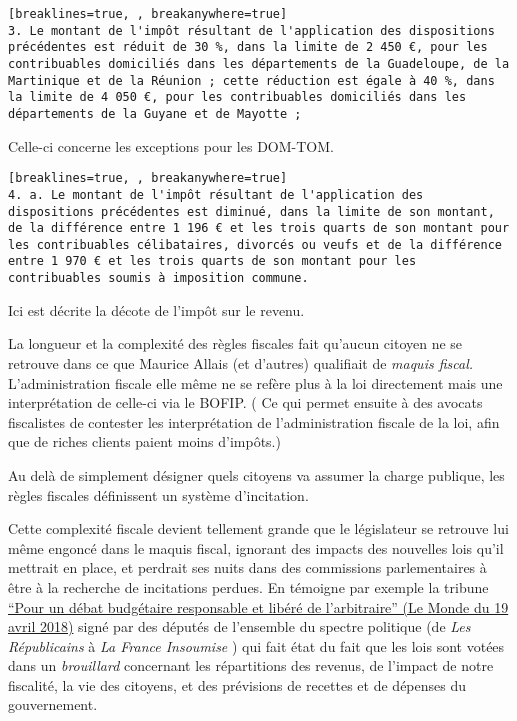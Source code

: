 \begin{Verbatim}[breaklines=true, , breakanywhere=true]
3. Le montant de l'impôt résultant de l'application des dispositions précédentes est réduit de 30 %, dans la limite de 2 450 €, pour les contribuables domiciliés dans les départements de la Guadeloupe, de la Martinique et de la Réunion ; cette réduction est égale à 40 %, dans la limite de 4 050 €, pour les contribuables domiciliés dans les départements de la Guyane et de Mayotte ;
\end{Verbatim}

Celle-ci concerne les exceptions pour les DOM-TOM.

\begin{Verbatim}[breaklines=true, , breakanywhere=true]
4. a. Le montant de l'impôt résultant de l'application des dispositions précédentes est diminué, dans la limite de son montant, de la différence entre 1 196 € et les trois quarts de son montant pour les contribuables célibataires, divorcés ou veufs et de la différence entre 1 970 € et les trois quarts de son montant pour les contribuables soumis à imposition commune.
\end{Verbatim}

Ici est décrite la décote de l'impôt sur le revenu.

La longueur et la complexité des règles fiscales fait qu'aucun citoyen
ne se retrouve dans ce que Maurice Allais (et d'autres) qualifiait de
\emph{maquis fiscal.} L'administration fiscale elle même ne se refère
plus à la loi directement mais une interprétation de celle-ci via le
BOFIP. ( Ce qui permet ensuite à des avocats fiscalistes de contester
les interprétation de l'administration fiscale de la loi, afin que de
riches clients paient moins d'impôts.)

Au delà de simplement désigner quels citoyens va assumer la charge
publique, les règles fiscales définissent un système d'incitation.

Cette complexité fiscale devient tellement grande que le législateur se
retrouve lui même engoncé dans le maquis fiscal, ignorant des impacts
des nouvelles lois qu'il mettrait en place, et perdrait ses nuits dans
des commissions parlementaires à être à la recherche de incitations
perdues. En témoigne par exemple la tribune
\href{https://www.lemonde.fr/idees/article/2018/04/19/pour-un-debat-budgetaire-responsable-et-libere-de-l-arbitraire_5287908_3232.html}{``Pour
un débat budgétaire responsable et libéré de l'arbitraire'' (Le Monde du
19 avril 2018)} signé par des députés de l'ensemble du spectre politique
(de \emph{Les Républicains} à \emph{La France Insoumise} ) qui fait état
du fait que les lois sont votées dans un \emph{brouillard} concernant
les répartitions des revenus, de l'impact de notre fiscalité, la vie des
citoyens, et des prévisions de recettes et de dépenses du gouvernement.


